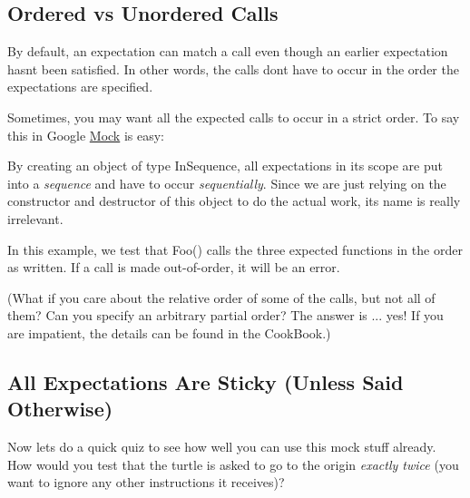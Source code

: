 \subsection*{Ordered vs Unordered Calls}

By default, an expectation can match a call even though an earlier expectation hasn\textquotesingle{}t been satisfied. In other words, the calls don\textquotesingle{}t have to occur in the order the expectations are specified.

Sometimes, you may want all the expected calls to occur in a strict order. To say this in Google \mbox{\hyperlink{class_mock}{Mock}} is easy\+:


\begin{DoxyCode}{0}
\DoxyCodeLine{  \{}
\DoxyCodeLine{}
\DoxyCodeLine{  \}}
\DoxyCodeLine{\}}
\end{DoxyCode}


By creating an object of type {\ttfamily In\+Sequence}, all expectations in its scope are put into a {\itshape sequence} and have to occur {\itshape sequentially}. Since we are just relying on the constructor and destructor of this object to do the actual work, its name is really irrelevant.

In this example, we test that {\ttfamily Foo()} calls the three expected functions in the order as written. If a call is made out-\/of-\/order, it will be an error.

(What if you care about the relative order of some of the calls, but not all of them? Can you specify an arbitrary partial order? The answer is ... yes! If you are impatient, the details can be found in the Cook\+Book.)

\subsection*{All Expectations Are Sticky (Unless Said Otherwise)}

Now let\textquotesingle{}s do a quick quiz to see how well you can use this mock stuff already. How would you test that the turtle is asked to go to the origin {\itshape exactly twice} (you want to ignore any other instructions it receives)?

